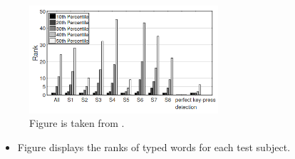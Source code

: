 \documentclass[ucs,9pt]{beamer}
\begin{document}
 
 \begin{frame}
 	\begin{figure}
 		\centering
 		\includegraphics[width=7cm]{imgs/RankOfAverage.png}
 		\caption{Figure is taken from \cite{b1}.}
 	\end{figure}
 \begin{itemize}
	 \item Figure displays the ranks of typed words for each test subject.
	 
	 
	

\end{itemize}
\end{frame}
\end{document}
